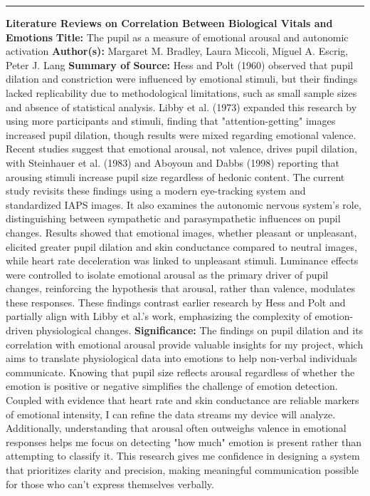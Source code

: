 \documentclass[12pt, research paper]{report}
\begin{document}
	\noindent \rule{13.85cm}{0.01cm}
	\noindent \textbf{Literature Reviews on Correlation Between Biological Vitals and Emotions}
	\newline \textbf{Title:} The pupil as a measure of emotional arousal and autonomic activation
	\newline \textbf{Author(s):} Margaret M. Bradley, Laura Miccoli, Miguel A. Escrig, Peter J. Lang
	\newline \textbf{Summary of Source:} Hess and Polt (1960) observed that pupil dilation and constriction were influenced by emotional stimuli, but their findings lacked replicability due to methodological limitations, such as small sample sizes and absence of statistical analysis. Libby et al. (1973) expanded this research by using more participants and stimuli, finding that "attention-getting" images increased pupil dilation, though results were mixed regarding emotional valence. Recent studies suggest that emotional arousal, not valence, drives pupil dilation, with Steinhauer et al. (1983) and Aboyoun and Dabbs (1998) reporting that arousing stimuli increase pupil size regardless of hedonic content.
	The current study revisits these findings using a modern eye-tracking system and standardized IAPS images. It also examines the autonomic nervous system's role, distinguishing between sympathetic and parasympathetic influences on pupil changes. Results showed that emotional images, whether pleasant or unpleasant, elicited greater pupil dilation and skin conductance compared to neutral images, while heart rate deceleration was linked to unpleasant stimuli. Luminance effects were controlled to isolate emotional arousal as the primary driver of pupil changes, reinforcing the hypothesis that arousal, rather than valence, modulates these responses. These findings contrast earlier research by Hess and Polt and partially align with Libby et al.'s work, emphasizing the complexity of emotion-driven physiological changes.
	\newline \textbf{Significance:} The findings on pupil dilation and its correlation with emotional arousal provide valuable insights for my project, which aims to translate physiological data into emotions to help non-verbal individuals communicate. Knowing that pupil size reflects arousal regardless of whether the emotion is positive or negative simplifies the challenge of emotion detection. Coupled with evidence that heart rate and skin conductance are reliable markers of emotional intensity, I can refine the data streams my device will analyze. Additionally, understanding that arousal often outweighs valence in emotional responses helps me focus on detecting "how much" emotion is present rather than attempting to classify it. This research gives me confidence in designing a system that prioritizes clarity and precision, making meaningful communication possible for those who can't express themselves verbally.
	\bigskip 
	
\end{document}
